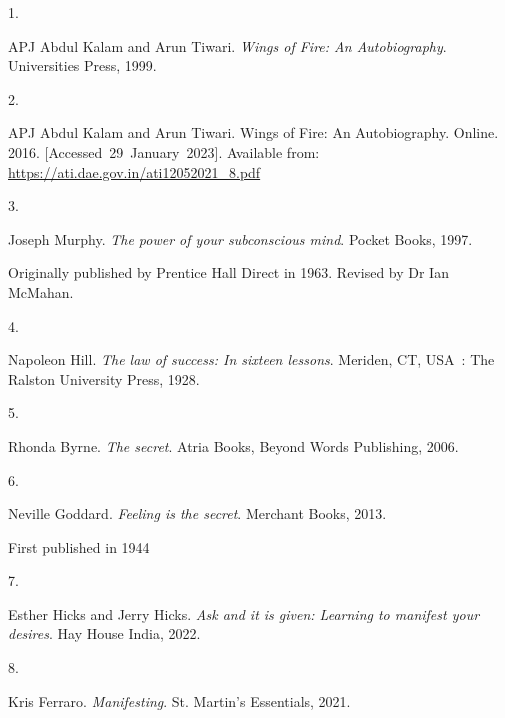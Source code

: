 \documentclass[
  a4paper,
]{article}
\newlength{\cslhangindent}
\newlength{\csllabelwidth}
\newlength{\cslentryspacingunit} %
\newenvironment{CSLReferences}[2] %
 {%
  \setlength{\parindent}{0pt}
  \ifodd #1
  \let\oldpar\par
  \def\par{\hangindent=\cslhangindent\oldpar}
  \fi
  \setlength{\parskip}{#2\cslentryspacingunit}
 }%
 {}
\newcommand{\CSLLeftMargin}[1]{\parbox[t]{\csllabelwidth}{#1}}
\newcommand{\CSLRightInline}[1]{\parbox[t]{\linewidth - \csllabelwidth}{#1}\break}
\begin{document}
\hypertarget{refs}{}
\begin{CSLReferences}{0}{0}
\leavevmode{}%
\CSLLeftMargin{1. }%
\CSLRightInline{APJ Abdul Kalam and Arun Tiwari. \emph{{Wings of Fire:
An Autobiography}}. Universities Press, 1999. }

\leavevmode{}%
\CSLLeftMargin{2. }%
\CSLRightInline{APJ Abdul Kalam and Arun Tiwari. {Wings of Fire: An
Autobiography}. Online. 2016. {[}Accessed~29~January~2023{]}. Available
from: \url{https://ati.dae.gov.in/ati12052021_8.pdf}}

\leavevmode{}%
\CSLLeftMargin{3. }%
\CSLRightInline{Joseph Murphy. \emph{The power of your subconscious
mind}. Pocket Books, 1997. }%
\CSLRightInline{Originally published by Prentice Hall Direct in 1963.
Revised by Dr Ian McMahan.}

\leavevmode{}%
\CSLLeftMargin{4. }%
\CSLRightInline{Napoleon Hill. \emph{The law of success: In sixteen
lessons}. Meriden, CT, USA~: The Ralston University Press, 1928. }

\leavevmode{}%
\CSLLeftMargin{5. }%
\CSLRightInline{Rhonda Byrne. \emph{The secret}. Atria Books, Beyond
Words Publishing, 2006. }

\leavevmode{}%
\CSLLeftMargin{6. }%
\CSLRightInline{Neville Goddard. \emph{Feeling is the secret}. Merchant
Books, 2013. }%
\CSLRightInline{First published in 1944}

\leavevmode{}%
\CSLLeftMargin{7. }%
\CSLRightInline{Esther Hicks and Jerry Hicks. \emph{Ask and it is given:
Learning to manifest your desires}. Hay House India, 2022. }

\leavevmode{}%
\CSLLeftMargin{8. }%
\CSLRightInline{Kris Ferraro. \emph{Manifesting}. St. Martin's
Essentials, 2021. }

\end{CSLReferences}
\end{document}
